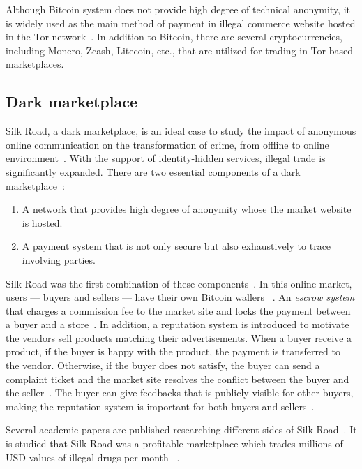 Although Bitcoin system does not provide high degree of technical anonymity, it is
widely used as the main method of payment in illegal commerce website hosted in
the Tor network~\cite{dis:usage_of_onion_services}. In addition to Bitcoin, there
are several cryptocurrencies, including Monero, Zcash, Litecoin, etc., that are
utilized for trading in Tor-based marketplaces.

\subsection{Dark marketplace}
%
Silk Road, a dark marketplace, is an ideal case to study the impact of anonymous
online communication on the transformation of crime, from offline to online
environment~\cite{paper:ebay_drugs_22}. With the support of identity-hidden
services, illegal trade is significantly expanded. There are two essential
components of a dark marketplace~\cite{dis:usage_of_onion_services}:

\begin{enumerate}
    \item A network that provides high degree of anonymity whose the market website
    is hosted.
    \item A payment system that is not only secure but also exhaustively to trace
    involving parties.
\end{enumerate}

Silk Road was the first combination of these components~\cite{dis:usage_of_onion_services}.
In this online market, users --- buyers and sellers --- have their own Bitcoin wallers
~\cite{report:surfing_silk_road_23}.
An \emph{escrow system} that charges a commission fee to the market site and locks
the payment between a buyer and a store~\cite{report:surfing_silk_road_23}. In addition,
a reputation system is introduced to motivate the vendors sell products matching
their advertisements. When a buyer receive a product, if the buyer is happy with
the product, the payment is transferred to the vendor. Otherwise, if the buyer
does not satisfy, the buyer can send a complaint ticket and the market site resolves
the conflict between the buyer and the seller~\cite{report:surfing_silk_road_23}.
The buyer can give feedbacks that is publicly visible for other buyers, making
the reputation system is important for both buyers and sellers~\cite{paper:reputation_sys_79}.

Several academic papers are published researching different sides of Silk Road~\cite{paper:ebay_drugs_22,
report:surfing_silk_road_23,dis:anonymity_system}. It is studied that Silk Road was
a profitable marketplace which trades millions of USD values of illegal drugs per month
~\cite{report:evaluate_Silk_Road_75}.

